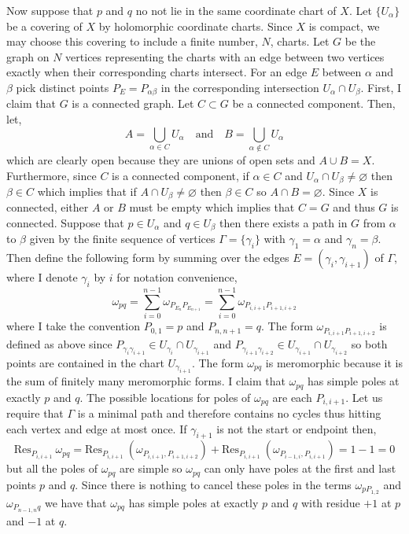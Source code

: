 \documentclass[12pt]{extarticle}
\theoremstyle{definition}
\newcommand{\Res}[2]{\mathrm{Res}_{#1} \: #2}
\begin{document}
Now suppose that $p$ and $q$ no not lie in the same coordinate chart of $X$. Let $\{ U_\alpha \}$ be a covering of $X$ by holomorphic coordinate charts. Since $X$ is compact, we may choose this covering to include a finite number, $N$, charts. Let $G$ be the graph on $N$ vertices representing the charts with an edge between two vertices exactly when their corresponding charts intersect.  For an edge $E$ between $\alpha$ and $\beta$ pick distinct points $P_E = P_{\alpha \beta}$ in the corresponding intersection $U_{\alpha} \cap U_{\beta}$. First, I claim that $G$ is a connected graph. Let $C \subset G$ be a connected component. Then, let,
\[ A = \bigcup_{\alpha \in C} U_{\alpha} \quad \text{and} \quad B = \bigcup_{\alpha \notin C} U_{\alpha} \]
which are clearly open because they are unions of open sets and $A \cup B = X$. Furthermore, since $C$ is a connected component, if $\alpha \in C$ and $U_{\alpha} \cap U_{\beta} \neq \varnothing$ then $\beta \in C$ which implies that if $A \cap U_{\beta} \neq \varnothing$ then $\beta \in C$ so $A \cap B = \varnothing$. Since $X$ is connected, either $A$ or $B$ must be empty which implies that $C = G$ and thus $G$ is connected. Suppose that $p \in U_{\alpha}$ and $q \in U_{\beta}$ then there exists a path in $G$ from $\alpha$ to $\beta$ given by the finite sequence of vertices $\Gamma = \{ \gamma_i \}$ with $\gamma_1 = \alpha$ and $\gamma_n = \beta$. Then define the following form by summing over the edges $E = (\gamma_i, \gamma_{i+1})$ of $\Gamma$, where I denote $\gamma_i$ by $i$ for notation convenience,
\[ \omega_{pq} =  \sum_{i = 0}^{n-1} \omega_{P_{E_n} P_{E_{n+1}}} = \sum_{i = 0}^{n-1} \omega_{P_{i,i+1} P_{i+1, i+2}}  \]
where I take the convention $P_{0,1} = p$ and $P_{n,n+1} = q$. 
The form $\omega_{P_{i,i+1} P_{i+1, i+2}}$ is defined as above since $P_{\gamma_i \gamma_{i+1}} \in U_{\gamma_{i}} \cap U_{\gamma_{i+1}}$ and $P_{\gamma_{i+1} \gamma_{i+2}} \in U_{\gamma_{i+1}} \cap U_{\gamma_{i+2}}$ so both points are contained in the chart $U_{\gamma_{i+1}}$. The form $\omega_{pq}$ is meromorphic because it is the sum of finitely many meromorphic forms. I claim that $\omega_{pq}$ has simple poles at exactly $p$ and $q$. The possible locations for poles of $\omega_{pq}$ are each $P_{i, i+1}$. Let us require that $\Gamma$ is a minimal path and therefore contains no cycles thus hitting each vertex and edge at most once. If $\gamma_{i+1}$ is not the start or endpoint then,
\[ \Res{P_{i,i+1}}{\omega_{pq}} = \Res{P_{i,i+1}}{(\omega_{P_{i,i+1}, P_{i+1,i+2}})} + \Res{P_{i,i+1}}{(\omega_{P_{i-1,i}, P_{i,i+1}})} = 1 - 1 = 0\]
but all the poles of $\omega_{pq}$ are simple so $\omega_{pq}$ can only have poles at the first and last points $p$ and $q$. Since there is nothing to cancel these poles in the terms $\omega_{p P_{1,2}}$ and $\omega_{P_{n-1,n} q}$ we have that $\omega_{pq}$ has simple poles at exactly $p$ and $q$ with residue $+1$ at $p$ and $-1$ at $q$. 
\end{document}
